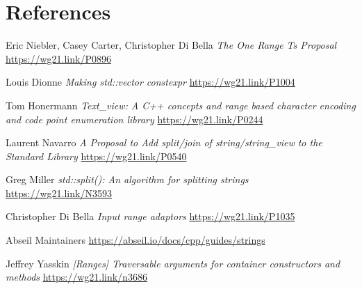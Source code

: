 \documentclass{wg21}
\begin{document}
\section{References}
\renewcommand{\section}[2]{}%
\begin{thebibliography}{9}

    Eric Niebler, Casey Carter, Christopher Di Bella
    \emph{The One Range Ts Proposal}\newline
    \url{https://wg21.link/P0896}

    Louis Dionne
    \emph{Making std::vector constexpr}\newline
    \url{https://wg21.link/P1004}

    Tom Honermann
    \emph{Text_view: A C++ concepts and range based character encoding and code point enumeration library}\newline
    \url{https://wg21.link/P0244}

    Laurent Navarro
    \emph{A Proposal to Add split/join of string/string_view to the Standard Library}\newline
    \url{https://wg21.link/P0540}

    Greg Miller
    \emph{std::split(): An algorithm for splitting strings}\newline
    \url{https://wg21.link/N3593}

    Christopher Di Bella
    \emph{Input range adaptors}\newline
    \url{https://wg21.link/P1035}

    Abseil Maintainers
    \url{https://abseil.io/docs/cpp/guides/strings}

    Jeffrey Yasskin
    \emph{[Ranges] Traversable arguments for container constructors and methods}\newline
    \url{https://wg21.link/n3686}

\end{thebibliography}
\end{document}
